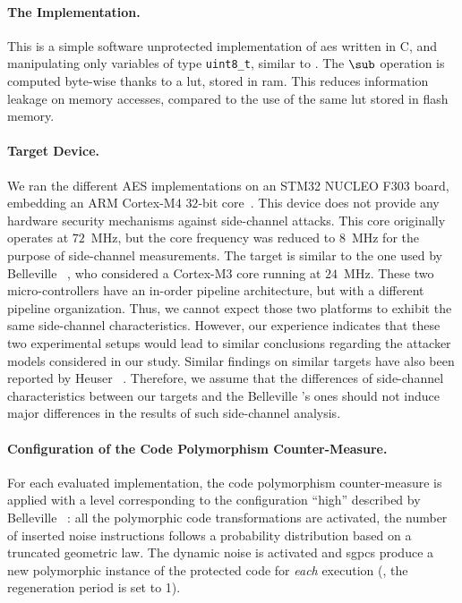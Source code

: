 \paragraph{The \aeshuitbit{} Implementation.}
This is a simple software unprotected implementation of \gls{aes} written in \textsf{C}, and manipulating only variables of type \verb+uint8_t+, similar to \cite{SmallportableAES1282020}.
The \(\sub\) operation is computed byte-wise thanks to a \gls{lut}, stored in \gls{ram}.
This reduces information leakage on memory accesses, compared to the use of the same \gls{lut} stored in flash memory.

\paragraph{Target Device.}
We ran the different AES implementations on an \textsf{STM32 NUCLEO F303} board, embedding an \textsf{ARM Cortex-M4} \(32\)-bit core~\cite{STMicroelectronicsNUCLEOF303RE}.
This device does not provide any hardware security mechanisms against side-channel attacks.
This core originally operates at \(72\)~MHz, but the core frequency was reduced to \(8\)~MHz for the purpose of side-channel measurements.
The target is similar to the one used by Belleville \etal{}~\cite{belleville_automated_2019}, who considered a \textsf{Cortex-M3} core running at \(24\)~MHz.
These two micro-controllers have an in-order pipeline architecture, but with a different pipeline organization.
Thus, we cannot expect those two platforms to exhibit the same side-channel characteristics.
However, our experience indicates that these two experimental setups would lead to similar conclusions regarding the attacker models considered in our study.
Similar findings on similar targets have also been reported by Heuser \etal{}~\cite{heuser_physical_2020}.
Therefore, we assume that the differences of side-channel characteristics between our targets and the Belleville \etal{}'s ones should not induce major differences in the results of such side-channel analysis.

\paragraph{Configuration of the Code Polymorphism Counter-Measure.}
For each evaluated implementation, the code polymorphism counter-measure is applied with a level corresponding to the configuration ``\textsf{high}'' described by Belleville \etal{}~\cite{belleville_automated_2019}: all the polymorphic code transformations  are activated, the number of inserted noise instructions follows a probability distribution based on a truncated geometric law.
The dynamic noise is activated and \glspl{sgpc} produce a new polymorphic instance of the protected code for \emph{each} execution (\ie{}, the regeneration period is set to 1).

